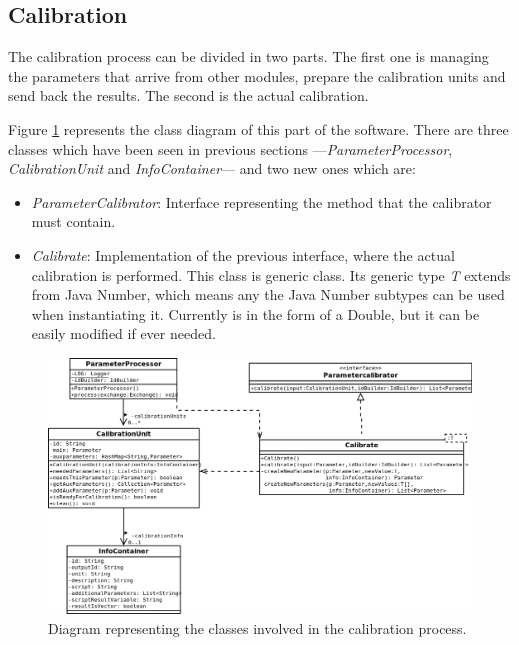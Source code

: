 \subsection{Calibration}
The calibration process can be divided in two parts. The first one is managing the parameters that arrive from other modules, prepare the calibration units and send back the results. The second is the actual calibration. 

Figure \ref{f5.4} represents the class diagram of this part of the software. There are three classes which have been seen in previous sections ---\emph{ParameterProcessor}, \emph{CalibrationUnit} and \emph{InfoContainer}--- and two new ones which are:
\begin{itemize}
\item \emph{ParameterCalibrator}: Interface representing the method that the calibrator must contain.
\item \emph{Calibrate}: Implementation of the previous interface, where the actual calibration is performed. This class is generic class. Its generic type \emph{T} extends from Java Number, which means any the Java Number subtypes can be used when instantiating it. Currently is in the form of a Double, but it can be easily modified if ever needed.
\end{itemize}


\begin{figure}[H]
\centerline{\includegraphics[width=1\textwidth]{images/CalibrationClassDiagram.png}}
\caption{Diagram representing the classes involved in the calibration process.}
\label{f5.4}
\end{figure}

